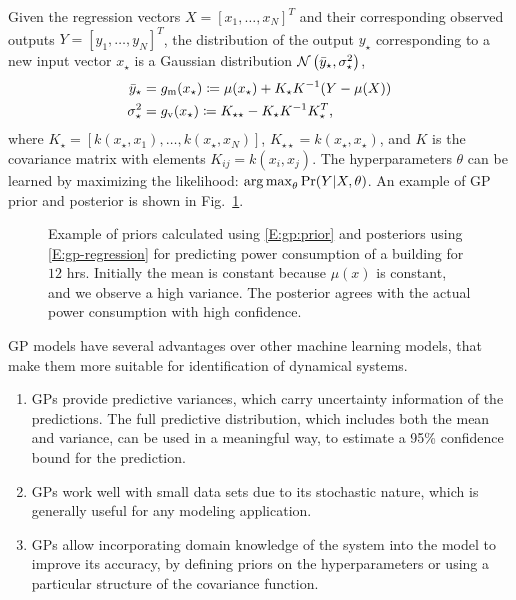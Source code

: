 Given the regression vectors \(X = [x_1, \dots, x_N]^T\) and their corresponding observed outputs \(Y = [y_1, \dots, y_N]^T\), the distribution of the output \(y_\star\) corresponding to a new input vector \(x_\star\) is a Gaussian distribution \(\operatorname*{\mathcal{N}}\left(\bar{y}_\star, \sigma_\star^2\right)\),
\begin{subequations}
\label{E:gp-regression}
\begin{align}
\bar{y}_\star &= g_{\mathrm{m}} (x_{\star}) \coloneqq \mu(x_\star) + K_\star K^{-1} (Y - \mu(X))\\
\sigma_\star^2 &= g_{\mathrm{v}} (x_{\star}) \coloneqq K_{\star \star} - K_\star K^{-1} K_\star^T \text,
\end{align}
\end{subequations}
where \(K_\star = [k(x_\star, x_1), \dots, k(x_\star, x_N)]\), \(K_{\star \star} = k(x_\star, x_\star)\), and $K$ is the covariance matrix with elements \(K_{ij} = k(x_i, x_j)\).
The hyperparameters $\theta$ can be learned by maximizing the likelihood: \(\operatorname*{arg\,max}_\theta \Pr(Y \vert X, \theta)\).
An example of GP prior and posterior is shown in Fig.~\ref{F:gp:prior:posterior}. %


\begin{figure}[!tb]
  \centering
  \setlength\fwidth{\columnwidth}
  \setlength\hwidth{0.5\fwidth}
  \resizebox{\columnwidth}{!}{}
  \caption{Example of priors calculated using \eqref{E:gp:prior} and
    posteriors using \eqref{E:gp-regression} for predicting power
    consumption of a building for \(12\) hrs. Initially the mean is
    constant because \(\mu(x)\) is constant, and we observe a high
    variance. The posterior agrees with the actual power consumption
    with high confidence.}
  \label{F:gp:prior:posterior}
\end{figure}

GP models have several advantages over other machine learning models, that make them more suitable for identification of dynamical systems.
\begin{enumerate}
\item GPs provide predictive variances, which carry uncertainty information of the predictions. The full predictive distribution, which includes both the mean and variance, can be used in a meaningful way, \eg to estimate a 95\% confidence bound for the prediction.
\item GPs work well with small data sets due to its stochastic nature, which is generally useful for any modeling application.
\item GPs allow incorporating domain knowledge of the system %
  into the model to improve its accuracy, by defining priors on the hyperparameters or using a particular structure of the covariance function.
\end{enumerate}

